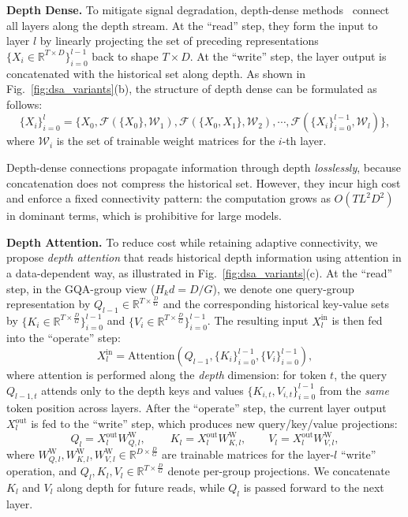 \documentclass[]{bytedance_seed}
\newcommand{\myPara}[1]{\vspace{.05in}\noindent\textbf{#1.}}
\begin{document}
\myPara{Depth Dense}
To mitigate signal degradation, depth-dense methods~\cite{huang2017densenet,pagliardini2024denseformer} connect all layers along the depth stream.
At the ``read'' step, they form the input to layer $l$ by linearly projecting the set of preceding representations $\{X_i\in\mathbb{R}^{T\times D}\}_{i=0}^{l-1}$ back to shape $T\times D$.
At the ``write'' step, the layer output is concatenated with the historical set along depth.
As shown in Fig.~\ref{fig:dsa_variants}(b), the structure of depth dense can be formulated as follows:
\begin{equation}
  \{X_{i}\}_{i=0}^{l}=\{X_0, \mathcal{F}(\{X_0\}, \mathcal{W}_{1}), \mathcal{F}(\{X_0, X_1\}, \mathcal{W}_{2}), \cdots ,\mathcal{F}(\{{X_i}\}_{i=0}^{l-1}, \mathcal{W}_{l})\},
\end{equation}
where $\mathcal{W}_{i}$ is the set of trainable weight matrices for the $i$-th layer.

Depth-dense connections propagate information through depth \emph{losslessly}, because concatenation does not compress the historical set.
However, they incur high cost and enforce a fixed connectivity pattern: the computation grows as $O(TL^2D^2)$ in dominant terms, which is prohibitive for large models.



\myPara{Depth Attention}
To reduce cost while retaining adaptive connectivity, we propose \emph{depth attention} that reads historical depth information using attention in a data-dependent way, as illustrated in Fig.~\ref{fig:dsa_variants}(c).
At the ``read'' step, in the GQA-group view ($H_kd=D/G$), we denote one query-group representation by $Q_{l-1}\in\mathbb{R}^{T\times \frac{D}{G}}$ and the corresponding historical key-value sets by $\{K_i\in\mathbb{R}^{T\times \frac{D}{G}}\}_{i=0}^{l-1}$ and $\{V_i\in\mathbb{R}^{T\times \frac{D}{G}}\}_{i=0}^{l-1}$.
The resulting input $X_{l}^{\text{in}}$ is then fed into the ``operate'' step:
\begin{equation}
  X_{l}^{\text{in}} = \mathrm{Attention}(Q_{l-1}, \{{K_i}\}_{i=0}^{l-1}, \{{V_i}\}_{i=0}^{l-1}),
\end{equation}
where attention is performed along the \emph{depth} dimension: for token $t$, the query $Q_{l-1,t}$ attends only to the depth keys and values $\{K_{i,t}, V_{i,t}\}_{i=0}^{l-1}$ from the \emph{same} token position across layers.
After the ``operate'' step, the current layer output $X_{l}^{\text{out}}$ is fed to the ``write'' step, which produces new query/key/value projections:
\begin{equation}
    Q_{l} = X_{l}^{\text{out}} W_{Q, l}^\text{W},\ \ \ \ \ \ \ \ \ \  K_l = X_{l}^{\text{out}} W_{K, l}^\text{W},\ \ \ \ \ \ \ \ \ V_l = X_{l}^{\text{out}} W_{V, l}^\text{W},
\end{equation}
where $W_{Q, l}^\text{W}, W_{K, l}^\text{W}, W_{V, l}^\text{W}\in\mathbb{R}^{D\times \frac{D}{G}}$ are trainable matrices for the layer-$l$ ``write'' operation, and $Q_l,K_l,V_l\in\mathbb{R}^{T\times \frac{D}{G}}$ denote per-group projections.
We concatenate $K_l$ and $V_l$ along depth for future reads, while $Q_l$ is passed forward to the next layer.
\end{document}
